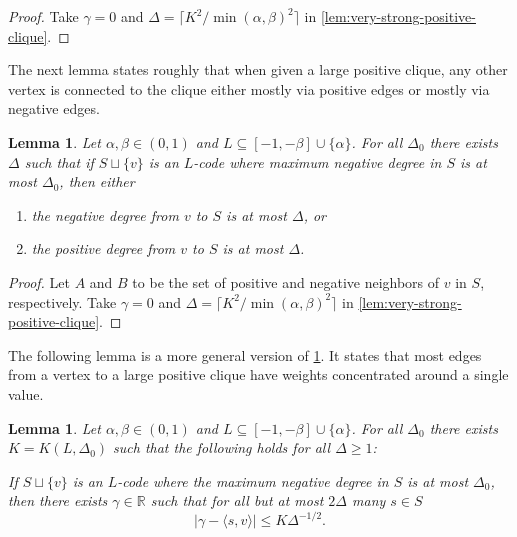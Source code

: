 \documentclass[reqno, 11pt]{amsart}
\newtheorem{lemma}[theorem]{Lemma}
\theoremstyle{definition}
\theoremstyle{remark}
\newcommand{\RR}{\mathbb{R}}
\begin{document}
\begin{proof}
	Take $\gamma=0$ and $\Delta = \lceil K^2/\min(\alpha,\beta)^2 \rceil$ in \cref{lem:very-strong-positive-clique}.
\end{proof}


The next lemma states roughly that when given a large positive clique, any other vertex is connected to the clique either mostly via positive edges or mostly via negative edges.

\begin{lemma}\label{lem:positive-clique}
Let $\alpha, \beta \in (0,1)$ and $L \subseteq [-1,-\beta]\cup\{\alpha\}$. For all $\Delta_0$ there exists $\Delta$ such that if $S\sqcup\{v\}$ is an $L$-code where maximum negative degree in $S$ is at most $\Delta_0$, then either
\begin{enumerate}
    \item[(a)] the negative degree from $v$ to $S$ is at  most $\Delta$, or
    \item[(b)]  the positive degree from $v$ to $S$ is at  most $\Delta$.
\end{enumerate}
\end{lemma}

\begin{proof}
	Let $A$ and $B$ to be the set of positive and negative neighbors of $v$ in $S$, respectively. Take $\gamma=0$ and $\Delta = \lceil K^2/\min(\alpha,\beta)^2 \rceil$ in \cref{lem:very-strong-positive-clique}.
\end{proof}

The following lemma is a more general version of \cref{lem:positive-clique}. It states that most edges from a vertex to a large positive clique have weights concentrated around a single value.

\begin{lemma}\label{lem:edges-to-positive-clique}
Let $ \alpha, \beta \in (0,1)$ and $L \subseteq [-1,-\beta]\cup\{\alpha\}$. For all $\Delta_0$ there exists $K = K(L, \Delta_0)$ such that the following holds for all $\Delta \geq 1$:

If $S\sqcup\{v\}$ is an $L$-code where the maximum negative degree in $S$ is at most $\Delta_0$, then there exists $\gamma \in \RR$ such that for all but at most $2\Delta$ many $s \in S$
\[
	|\gamma - \langle s, v \rangle| \leq K \Delta^{-1/2}.
\]
\end{lemma}
\end{document}
